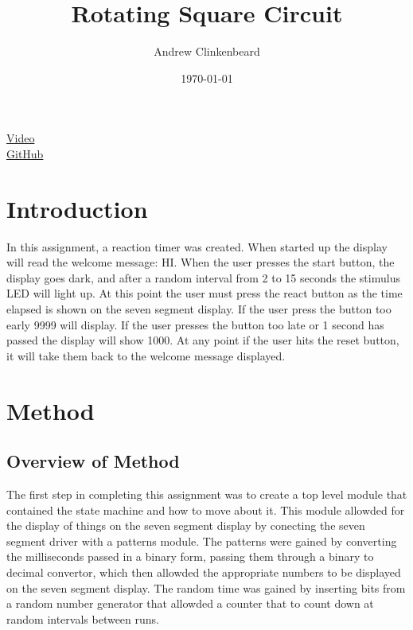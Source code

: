 \documentclass[12pt]{article}
\title{Rotating Square Circuit}
\author{Andrew Clinkenbeard}
\date{\today}
\newcommand{\Verilog}[2][]{%
	
}
\begin{document}
\maketitle
\href {https://www.youtube.com/watch?v=ml-7Efxw5FM} {Video}\\
\href {https://github.com/andrew-clinkenbeard/Reaction-Timer} {GitHub}
\section{Introduction}

In this assignment, a reaction timer was created. When started up the display will read the welcome message: HI. When the user presses the start button, the display goes dark, and after a random interval from 2 to 15 seconds the stimulus LED will light up. At this point the user must press the react button as the time elapsed is shown on the seven segment display. If the user press the button too early 9999 will display. If the user presses the button too late or 1 second has passed the display will show 1000. At any point if the user hits the reset button, it will take them back to the welcome message displayed. 





\section{Method}
\subsection{Overview of Method}
The first step in completing this assignment was to create a top level module that contained the state machine and how to move about it. This module allowded for the display of things on the seven segment display by conecting the seven segment driver with a patterns module. The patterns were gained by converting the milliseconds passed in a binary form, passing them through a binary to decimal convertor, which then allowded the appropriate numbers to be displayed on the seven segment display. The random time was gained by inserting bits from a random number generator that allowded a counter that to count down at random intervals between runs.
\Verilog[firstline=4]{./state.sv}
\end{document}
